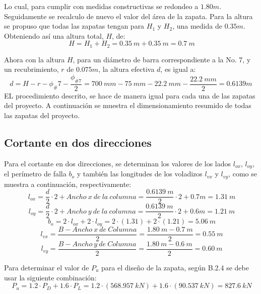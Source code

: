 \documentclass[12pt]{article}
\begin{document}
Lo cual, para cumplir con medidas constructivas se redondeo a $1.80 m$. Seguidamente se recalculo de nuevo el valor del área de la zapata. Para la altura se propuso que todas las zapatas tengan para $H_{1}$ y $H_{2}$, una medida de $0.35 m$. Obteniendo así una altura total, $H$, de:
\begin{equation*}
    \ H=H_{1}+H_{2}=0.35~m+0.35~m=0.7~m
\end{equation*}

Ahora con la altura $H$, para un diámetro de barra correspondiente a la No. 7, y un recubrimiento, $r$ de $0.075 m$, la altura efectiva $d$, es igual a:
\begin{equation*}
     d=H-r-\phi_\#7-\frac{\phi_{\#7}}{2}=700~mm-75~mm-22.2~mm-\frac{22.2~mm}{2}=0.6139m
\end{equation*}
EL procedimiento descrito, se hace de manera igual para cada una de las zapatas del proyecto. A continuación se muestra el dimensionamiento resumido de todas las zapatas del proyecto.

\subsection{Cortante en dos direcciones}
Para el cortante en dos direcciones, se determinan los valores de los lados $l_{ox}$, $l_{oy}$, el perímetro de falla $b_{o}$ y también las longitudes de los voladizos $l_{vx}$ y $l_{vy}$, como se muestra a continuación, respectivamente:
\begin{equation*}
    \ l_{ox}= \frac{d}{2}\cdot 2 + Ancho~x~de~la~columna = \frac{0.6139~m}{2}\cdot 2 + 0.7m=1.31~m
\end{equation*}
\begin{equation*}
    \ l_{oy}= \frac{d}{2}\cdot 2 + Ancho~y~de~la~columna = \frac{0.6139~m}{2}\cdot 2 + 0.6m=1.21~m
\end{equation*}
\begin{equation*}
    \ b_{o}= 2\cdot l_{ox} + 2\cdot l_{oy}= 2\cdot(1.31)+2\cdot(1.21) =5.06~m
\end{equation*}
\begin{equation*}
    \ l_{vx}= \frac{B-Ancho~x~de~Columna}{2}= \frac{1.80~m-0.7~m}{2}=0.55~m
\end{equation*}
\begin{equation*}
    \ l_{vy}= \frac{B-Ancho~y~de~Columna}{2}= \frac{1.80~m-0.6~m}{2}=0.60~m
\end{equation*}

Para determinar el valor de $P_{u}$ para el diseño de la zapata, según B.2.4 se debe usar la siguiente combinación:
\begin{equation*}
    \ P_{u}= 1.2\cdot P_{D}+1.6\cdot P_{L}=1.2\cdot (568.957~kN)+1.6\cdot (90.537~kN)=827.6~kN
\end{equation*}
\end{document}

